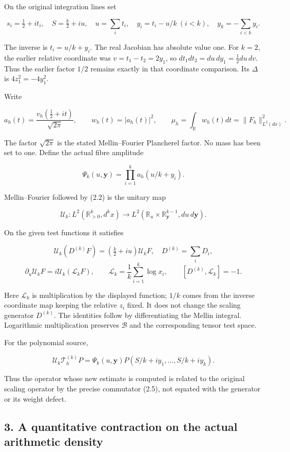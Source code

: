 \documentclass[
]{article}
\begin{document}
On the original integration lines set

\[s_i=\tfrac12+it_i,\quad S=\tfrac{k}{2}+iu,\quad u=\sum_i t_i,\quad y_i=t_i-u/k\ (i<k),\quad y_k=-\sum_{i<k}y_i.\tag{2.2}\]

The inverse is \(t_i=u/k+y_i\). The real Jacobian has absolute value
one. For \(k=2\), the earlier relative coordinate was
\(v=t_1-t_2=2y_1\), so \(dt_1dt_2=du\,dy_1=\tfrac12du\,dv\). Thus the
earlier factor \(1/2\) remains exactly in that coordinate comparison.
Its \(\Delta\) is \(4z_1^2=-4y_1^2\).

Write

\[a_h(t)=\frac{v_h(\tfrac12+it)}{\sqrt{2\pi}},\qquad w_h(t)=|a_h(t)|^2,\qquad \mu_h=\int_{\mathbb R}w_h(t)dt=\|F_h\|_{L^2(dx)}^2.\tag{2.3}\]

The factor \(\sqrt{2\pi}\) is the stated Mellin--Fourier Plancherel
factor. No mass has been set to one. Define the actual fibre amplitude

\[\Psi_k(u,\mathbf y)=\prod_{i=1}^k a_h(u/k+y_i).\tag{2.4}\]

Mellin--Fourier followed by (2.2) is the unitary map

\[\mathscr U_k:L^2(\mathbb R_{>0}^k,d^kx)\longrightarrow L^2(\mathbb R_u\times\mathbb R_{\mathbf y}^{k-1},du\,d\mathbf y).\]

On the given test functions it satisfies

\[\mathscr U_k(D^{(k)}F)=(\tfrac{k}{2}+iu)\mathscr U_kF,\quad D^{(k)}=\sum_iD_i,\]
\[\partial_u\mathscr U_kF=i\mathscr U_k(\mathscr L_kF),\qquad \mathscr L_k=\frac1k\sum_{i=1}^k\log x_i,\qquad [D^{(k)},\mathscr L_k]=-1.\tag{2.5}\]

Here \(\mathscr L_k\) is multiplication by the displayed function;
\(1/k\) comes from the inverse coordinate map keeping the relative
\(z_i\) fixed. It does not change the scaling generator \(D^{(k)}\). The
identities follow by differentiating the Mellin integral. Logarithmic
multiplication preserves \(\mathscr B\) and the corresponding tensor
test space.

For the polynomial source,

\[\mathscr U_k\mathcal T_h^{(k)}P=\Psi_k(u,\mathbf y)P(S/k+i y_1,\ldots,S/k+i y_k).\tag{2.6}\]

Thus the operator whose new estimate is computed is related to the
original scaling operator by the precise commutator (2.5), not equated
with the generator or its weight defect.

\subsection{3. A quantitative contraction on the actual arithmetic
density}\label{a-quantitative-contraction-on-the-actual-arithmetic-density}
\end{document}
